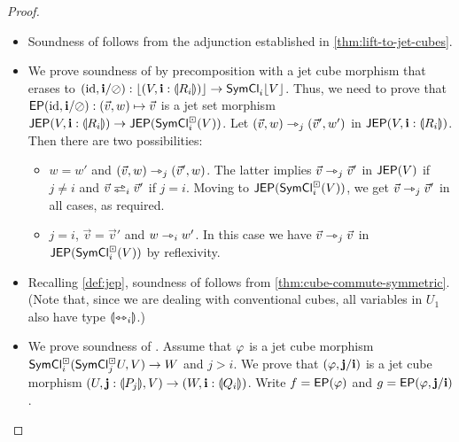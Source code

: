 \documentclass[a4paper]{memoir}
\begin{document}
\begin{proof}
\begin{itemize}
		\item Soundness of  follows from the adjunction established in \cref{thm:lift-to-jet-cubes}.
		
		\item We prove soundness of  by precomposition with a jet cube morphism that erases to $(\mathrm{id}, \mathbf{i} / \oslash) : \mathopen{}\left\lfloor (V, \mathbf{i} : {\llparenthesis R_i \rrparenthesis}) \right\rfloor\mathclose{} \to \mathsf{SymCl}_i \mathopen{}\left\lfloor V \right\rfloor\mathclose{}$.
		Thus, we need to prove that $\mathsf{EP}(\mathrm{id}, \mathbf{i} / \oslash) : (\vec v, w) \mapsto \vec v$ is a jet set morphism $\mathsf{JEP}(V, \mathbf{i} : {\llparenthesis R_i \rrparenthesis})
		\to \mathsf{JEP}(\mathsf{SymCl}^\boxdot_i(V))$.
		Let $(\vec v, w) \rightarrowtriangle_j (\vec v', w')$ in $\mathsf{JEP}(V, \mathbf{i} : {\llparenthesis R_i \rrparenthesis})$.
		Then there are two possibilities:
		\begin{itemize}
			\item $w = w'$ and $(\vec v, w) \rightarrowtriangle_j (\vec v', w)$. The latter implies $\vec v \rightarrowtriangle_j \vec v'$ in $\mathsf{JEP}(V)$ if $j \neq i$ and $\vec v \infrajet_i \vec v'$ if $j = i$. Moving to $\mathsf{JEP}(\mathsf{SymCl}^\boxdot_i(V))$, we get $\vec v \rightarrowtriangle_j \vec v'$ in all cases, as required.
			\item $j = i$, $\vec v = \vec v'$ and $w \rightarrowtriangle_i w'$. In this case we have $\vec v \rightarrowtriangle_j \vec v$ in $\mathsf{JEP}(\mathsf{SymCl}^\boxdot_i(V))$ by reflexivity.
		\end{itemize}
		
		\item Recalling \cref{def:jep}, soundness of  follows from \cref{thm:cube-commute-symmetric}.
		(Note that, since we are dealing with conventional cubes, all variables in $U_1$ also have type ${\llparenthesis \leftrightarrowtriangle_i \rrparenthesis}$.)
		
		\item We prove soundness of .
		Assume that $\varphi$ is a jet cube morphism $\mathsf{SymCl}^\boxdot_i(\mathsf{SymCl}^\boxdot_j U, V) \to W$ and $j > i$.
		We prove that $(\varphi, \mathbf{j} / \mathbf{i})$ is a jet cube morphism $(U, \mathbf{j} : {\llparenthesis P_j \rrparenthesis}, V) \to (W, \mathbf{i} : {\llparenthesis Q_i \rrparenthesis})$.
		Write $f = \mathsf{EP}(\varphi)$ and $g = \mathsf{EP}(\varphi, \mathbf{j} / \mathbf{i})$.
		

\end{itemize}
\end{proof}
\end{document}
